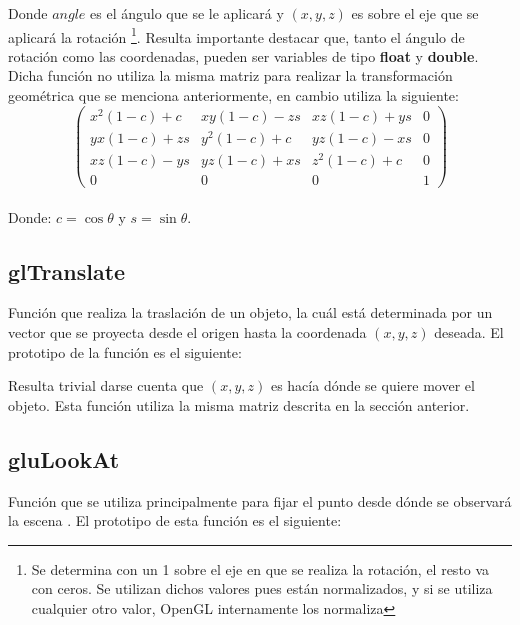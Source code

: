 \documentclass[journal]{IEEEtran}
\begin{document}
 

Donde $angle$ es el ángulo que se le aplicará y $(x,y,z)$ es sobre el eje que se aplicará la rotación \footnote{Se determina con un 1 sobre el eje en que se realiza la rotación, el resto va con ceros. Se utilizan dichos valores pues están normalizados, y si se utiliza cualquier otro valor, OpenGL internamente los normaliza}. Resulta importante destacar que, tanto el ángulo de rotación como las coordenadas, pueden ser variables de tipo \textbf{float} y \textbf{double}.\\

Dicha función no utiliza la misma matriz para realizar la transformación geométrica que se menciona anteriormente, en cambio utiliza la siguiente:\\

\[
	\left( 
		\begin{array}{cccc}
			x^{2}(1-c)+c & xy(1-c)-zs & xz(1-c)+ys & 0 \\
			yx(1-c)+zs & y^{2}(1-c)+c & yz(1-c)-xs & 0 \\
			xz(1-c)-ys & yz(1-c)+xs & z^{2}(1-c)+c & 0 \\
			0 & 0 & 0 & 1
		\end{array}
	\right)
\]\\

Donde: $c = \cos\theta$ y $s=\sin\theta$.

\subsection{glTranslate}

Función que realiza la traslación de un objeto, la cuál está determinada por un vector que se proyecta desde el origen hasta la coordenada $(x,y,z)$ deseada\cite{gltranslate}. El prototipo de la función es el siguiente:

 

Resulta trivial darse cuenta que $(x,y,z)$ es hacía dónde se quiere mover el objeto. Esta función utiliza la misma matriz descrita en la sección anterior.

\subsection{gluLookAt}

Función que se utiliza principalmente para fijar el punto desde dónde se observará la escena \cite{glulookat}. El prototipo de esta función es el siguiente:
\end{document}
